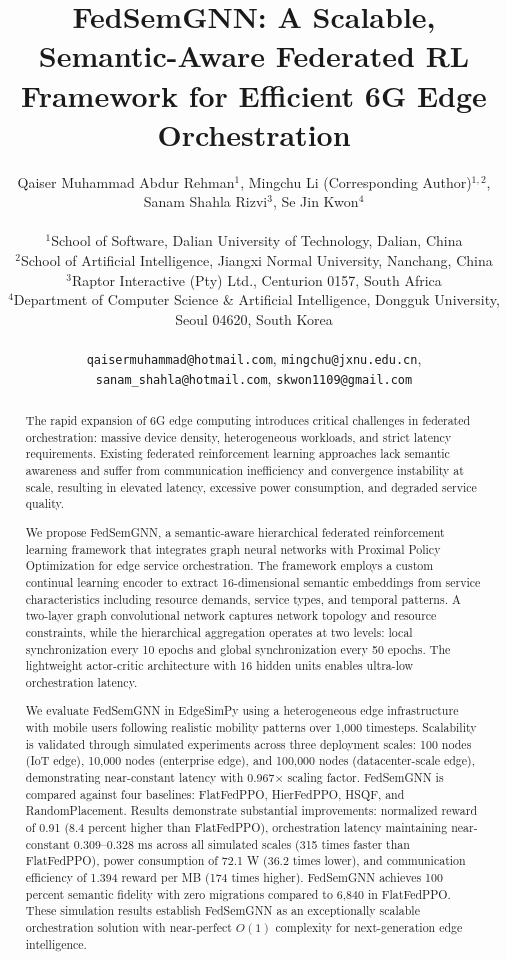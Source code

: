 \documentclass[conference]{IEEEtran}
\title{FedSemGNN: A Scalable, Semantic-Aware Federated RL Framework for Efficient 6G Edge Orchestration}
\author{
	
	Qaiser Muhammad Abdur Rehman$^{1}$,
	Mingchu Li \small(Corresponding Author)$^{1,2}$,
	Sanam Shahla Rizvi$^{3}$,
	Se Jin Kwon$^{4}$\\
	
	
	\begin{tabular}{@{}c@{}}
		$^{1}$School of Software, Dalian University of Technology, Dalian, China\\
		$^{2}$School of Artificial Intelligence, Jiangxi Normal University, Nanchang, China\\
		$^{3}$Raptor Interactive (Pty) Ltd., Centurion 0157, South Africa\\
		$^{4}$Department of Computer Science \& Artificial Intelligence, Dongguk University, Seoul 04620, South Korea\\\\
		\texttt{qaisermuhammad@hotmail.com}, \texttt{mingchu@jxnu.edu.cn}, \texttt{sanam\_shahla@hotmail.com}, \texttt{skwon1109@gmail.com}\\
		
	\end{tabular}
}
\begin{document}
	
	\maketitle
	
	\begin{abstract}
		The rapid expansion of 6G edge computing introduces critical challenges in federated orchestration: massive device density, heterogeneous workloads, and strict latency requirements. Existing federated reinforcement learning approaches lack semantic awareness and suffer from communication inefficiency and convergence instability at scale, resulting in elevated latency, excessive power consumption, and degraded service quality.
		
		We propose FedSemGNN, a semantic-aware hierarchical federated reinforcement learning framework that integrates graph neural networks with Proximal Policy Optimization for edge service orchestration. The framework employs a custom continual learning encoder to extract 16-dimensional semantic embeddings from service characteristics including resource demands, service types, and temporal patterns. A two-layer graph convolutional network captures network topology and resource constraints, while the hierarchical aggregation operates at two levels: local synchronization every 10 epochs and global synchronization every 50 epochs. The lightweight actor-critic architecture with 16 hidden units enables ultra-low orchestration latency.
		
		We evaluate FedSemGNN in EdgeSimPy using a heterogeneous edge infrastructure with mobile users following realistic mobility patterns over 1,000 timesteps. Scalability is validated through simulated experiments across three deployment scales: 100 nodes (IoT edge), 10,000 nodes (enterprise edge), and 100,000 nodes (datacenter-scale edge), demonstrating near-constant latency with 0.967$\times$ scaling factor. FedSemGNN is compared against four baselines: FlatFedPPO, HierFedPPO, HSQF, and RandomPlacement. Results demonstrate substantial improvements: normalized reward of 0.91 (8.4 percent higher than FlatFedPPO), orchestration latency maintaining near-constant 0.309--0.328 ms across all simulated scales (315 times faster than FlatFedPPO), power consumption of 72.1 W (36.2 times lower), and communication efficiency of 1.394 reward per MB (174 times higher). FedSemGNN achieves 100 percent semantic fidelity with zero migrations compared to 6,840 in FlatFedPPO. These simulation results establish FedSemGNN as an exceptionally scalable orchestration solution with near-perfect $O(1)$ complexity for next-generation edge intelligence.
	\end{abstract}
	
\end{document}

